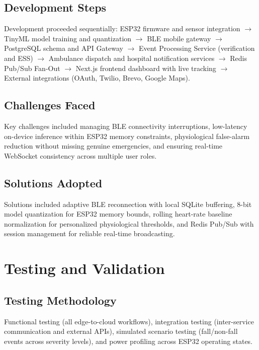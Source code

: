 \subsection{Development Steps}

Development proceeded sequentially: ESP32 firmware and sensor integration $\rightarrow$ TinyML model training and quantization $\rightarrow$ BLE mobile gateway $\rightarrow$ PostgreSQL schema and API Gateway $\rightarrow$ Event Processing Service (verification and ESS) $\rightarrow$ Ambulance dispatch and hospital notification services $\rightarrow$ Redis Pub/Sub Fan-Out $\rightarrow$ Next.js frontend dashboard with live tracking $\rightarrow$ External integrations (OAuth, Twilio, Brevo, Google Maps).

\subsection{Challenges Faced}

Key challenges included managing BLE connectivity interruptions, low-latency on-device inference within ESP32 memory constraints, physiological false-alarm reduction without missing genuine emergencies, and ensuring real-time WebSocket consistency across multiple user roles.

\subsection{Solutions Adopted}

Solutions included adaptive BLE reconnection with local SQLite buffering, 8-bit model quantization for ESP32 memory bounds, rolling heart-rate baseline normalization for personalized physiological thresholds, and Redis Pub/Sub with session management for reliable real-time broadcasting.

\section[Testing and Validation]{\textbf{Testing and Validation}}

\subsection{Testing Methodology}

Functional testing (all edge-to-cloud workflows), integration testing (inter-service communication and external APIs), simulated scenario testing (fall/non-fall events across severity levels), and power profiling across ESP32 operating states.

